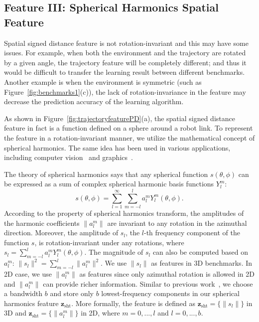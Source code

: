 \documentclass[letterpaper, 10 pt, conference]{ieeeconf}  %
\newcommand{\fsht}{\mbox{$\mathbf z_{\text{sht}}$}}
\begin{document}
\subsection{Feature III: Spherical Harmonics Spatial Feature}
Spatial signed distance feature is not rotation-invariant and this may have some issues.
For example, when both the environment and the trajectory are rotated by a given angle, the trajectory feature will be completely different; and thus it would be difficult to transfer the learning result between different benchmarks. Another example is when the environment is symmetric (such as Figure~\ref{fig:benchmarks1}(c)), the lack of rotation-invariance in the feature may decrease the prediction accuracy of the learning algorithm.

As shown in Figure~\ref{fig:trajectoryfeaturePD}(a), the spatial signed distance feature in fact is a function defined on a sphere around a robot link. To represent the feature in a rotation-invariant manner, we utilize the mathematical concept of spherical harmonics. The same idea has been used in various applications, including computer vision~\cite{Frome:2004:ROR} and graphics~\cite{Kazhdan:2003:RIS}.


The theory of spherical harmonics says that any spherical function $s(\theta, \phi)$ can be expressed as a sum of complex spherical harmonic basis functions $Y_l^m$: 
\begin{equation}
s(\theta, \phi) = \sum_{l=1}^{\infty} \sum_{m=-l}^{l} a_l^m Y_l^m(\theta, \phi).
\end{equation}
According to the property of spherical harmonics transform, the amplitudes of the harmonic coefficients $\|a_l^m\|$ are invariant to any rotation in the azimuthal direction. Moreover, the amplitude of $s_l$, the $l$-th frequency component of the function $s$, is rotation-invariant under any rotations, where $s_l = \sum_{m=-l}^{l}a_l^m Y_l^m(\theta, \phi)$. The magnitude of $s_l$ can also be computed based on $a_l^m$: $\|s_l\|^2 = \sum_{m=-l}^l \|a_l^m\|^2$. We use $\|s_l\|$ as features in 3D benchmarks. In 2D case, we use $\|a_l^m\|$ as features since only azimuthal rotation is allowed in 2D and $\|a_l^m\|$ can provide richer information. Similar to previous work~\cite{Frome:2004:ROR,Kazhdan:2003:RIS}, we choose a bandwidth $b$ and store only $b$ lowest-frequency components in our spherical harmonics feature $\fsht$. More formally, the feature is defined as $\fsht = \{\|s_l\|\}$ in 3D and $\fsht = \{\|a_l^m\|\}$ in 2D, where $m = 0,...,l$ and $l = 0,...,b$.
\end{document}
